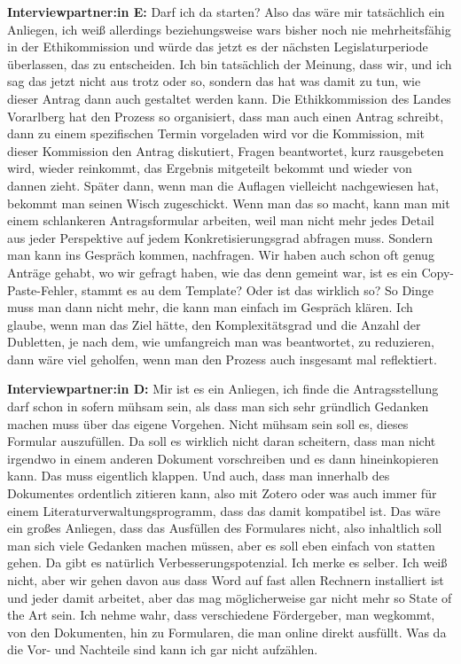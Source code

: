 \documentclass[a4paper,12pt,twoside]{scrreprt}
\begin{document}
\textbf{Interviewpartner:in E:} Darf ich da starten? Also das wäre mir tatsächlich ein Anliegen, ich weiß allerdings beziehungsweise wars bisher noch nie mehrheitsfähig in der Ethikommission und würde das jetzt es der nächsten Legislaturperiode überlassen, das zu entscheiden. Ich bin tatsächlich der Meinung, dass wir, und ich sag das jetzt nicht aus trotz oder so, sondern das hat was damit zu tun, wie dieser Antrag dann auch gestaltet werden kann. Die Ethikkommission des Landes Vorarlberg hat den Prozess so organisiert, dass man auch einen Antrag schreibt, dann zu einem spezifischen Termin vorgeladen wird vor die Kommission, mit dieser Kommission den Antrag diskutiert, Fragen beantwortet, kurz rausgebeten wird, wieder reinkommt, das Ergebnis mitgeteilt bekommt und wieder von dannen zieht. Später dann, wenn man die Auflagen vielleicht nachgewiesen hat, bekommt man seinen Wisch zugeschickt. Wenn man das so macht, kann man mit einem schlankeren Antragsformular arbeiten, weil man nicht mehr jedes Detail aus jeder Perspektive auf jedem Konkretisierungsgrad abfragen muss. Sondern man kann ins Gespräch kommen, nachfragen. Wir haben auch schon oft genug Anträge gehabt, wo wir gefragt haben, wie das denn gemeint war, ist es ein Copy-Paste-Fehler, stammt es au dem Template? Oder ist das wirklich so? So Dinge muss man dann nicht mehr, die kann man einfach im Gespräch klären. Ich glaube, wenn man das Ziel hätte, den Komplexitätsgrad und die Anzahl der Dubletten, je nach dem, wie umfangreich man was beantwortet, zu reduzieren, dann wäre viel geholfen, wenn man den Prozess auch insgesamt mal reflektiert.

\textbf{Interviewpartner:in D:} Mir ist es ein Anliegen, ich finde die Antragsstellung darf schon in sofern mühsam sein, als dass man sich sehr gründlich Gedanken machen muss über das eigene Vorgehen. Nicht mühsam sein soll es, dieses Formular auszufüllen. Da soll es wirklich nicht daran scheitern, dass man nicht irgendwo in einem anderen Dokument vorschreiben und es dann hineinkopieren kann. Das muss eigentlich klappen. Und auch, dass man innerhalb des Dokumentes ordentlich zitieren kann, also mit Zotero oder was auch immer für einem Literaturverwaltungsprogramm, dass das damit kompatibel ist. Das wäre ein großes Anliegen, dass das Ausfüllen des Formulares nicht, also inhaltlich soll man sich viele Gedanken machen müssen, aber es soll eben einfach von statten gehen. Da gibt es natürlich Verbesserungspotenzial. Ich merke es selber. Ich weiß nicht, aber wir gehen davon aus dass Word auf fast allen Rechnern installiert ist und jeder damit arbeitet, aber das mag möglicherweise gar nicht mehr so State of the Art sein. Ich nehme wahr, dass verschiedene Fördergeber, man wegkommt, von den Dokumenten, hin zu Formularen, die man online direkt ausfüllt. Was da die Vor- und Nachteile sind kann ich gar nicht aufzählen.
\end{document}
